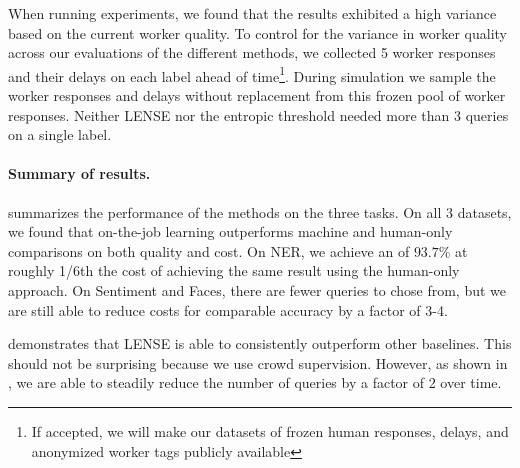When running experiments, we found that the results exhibited a high variance based on the current worker quality. %
To control for the variance in worker quality across our evaluations of the different methods, we collected 5 worker responses and their delays on each label ahead of time\footnote{If accepted, we will make our datasets of frozen human responses, delays, and anonymized worker tags publicly available}.
During simulation we sample the worker responses and delays without replacement from this frozen pool of worker responses. 
Neither LENSE nor the entropic threshold needed more than 3 queries on a single label.

%
%

\paragraph{Summary of results.}
 summarizes the performance of the methods on the three tasks.
On all 3 datasets, we found that on-the-job learning outperforms machine and human-only comparisons on both quality and cost. 
On NER, we achieve an \fone{} of $93.7\%$ at roughly 1/6th the cost of achieving the same result using the human-only approach. On Sentiment and Faces, there are fewer queries to chose from, but we are still able to reduce costs for comparable accuracy by a factor of 3-4.

 demonstrates that LENSE is able to consistently outperform other baselines.
This should not be surprising because we use crowd supervision.
However, as shown in , we are able to steadily reduce the number of queries by a factor of 2 over time.

